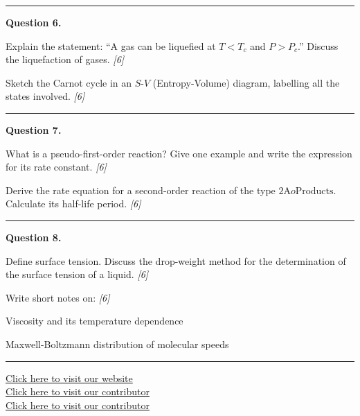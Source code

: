 \documentclass[11pt,a4paper]{article}
\newcommand{\pts}[1]{\hfill   \textit{[#1]}}
\begin{document}
\medskip\rule{\linewidth}{0.2pt}




\noindent   \textbf{Question 6.}

\begin{parts}
  \item Explain the statement: ``A gas can be liquefied at $T < T_c$ and $P > P_c$.'' Discuss the liquefaction of gases. \pts{6}
  \item Sketch the Carnot cycle in an $S$-$V$ (Entropy-Volume) diagram, labelling all the states involved. \pts{6}
\end{parts}

\medskip\rule{\linewidth}{0.2pt}




\noindent   \textbf{Question 7.}

\begin{parts}
  \item What is a pseudo-first-order reaction? Give one example and write the expression for its rate constant. \pts{6}
  \item Derive the rate equation for a second-order reaction of the type $2 \text{A}  o  \text{Products}$. Calculate its half-life period. \pts{6}
\end{parts}

\medskip\rule{\linewidth}{0.2pt}




\noindent   \textbf{Question 8.}

\begin{parts}
  \item Define surface tension. Discuss the drop-weight method for the determination of the surface tension of a liquid. \pts{6}
  \item Write short notes on: \pts{6}
  
\begin{parts}
    \item Viscosity and its temperature dependence
    \item Maxwell-Boltzmann distribution of molecular speeds
  \end{parts}
\end{parts}

\vfill
\rule{\linewidth}{0.4pt}

\begin{center}\small
  \href{https://bhu-exam.vercel.app/}{Click here to visit our website}\\[4pt]
  \href{https://me-aryan.vercel.app/}{Click here to visit our contributor}\\[4pt]
  \href{https://quashan-me.vercel.app/}{Click here to visit our contributor}
\end{center}
\end{document}
